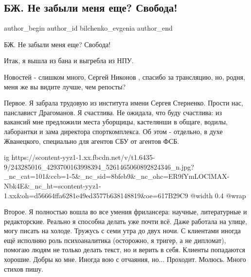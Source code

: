  
 
 
 
 
 
\subsection{БЖ. Не забыли меня еще? Свобода!}
\label{sec:28_09_2021.fb.bilchenko_evgenia.1.ne_zabyli_svoboda}
 
\ifcmt
 author_begin
   author_id bilchenko_evgenia
 author_end
\fi

БЖ. Не забыли меня еще? Свобода!

Итак, я вышла из бана и выгребла из НПУ. 

Новостей - слишком много, Сергей Никонов , спасибо за трансляцию, но, родня,
меня же вы видите лучше, чем репосты? 

Первое. Я забрала трудовую из института имени Сергея Стерненко. Прости нас,
панславист Драгоманов. Я счастлива. Не ожидала, что буду счастлива: из вакансий
мне предложили места уборщицы, кастелянши в общаге, водилы, лаборантки и зама
директора спорткомплекса. Об этом - отдельно, в духе Жванецкого, специально для
агентов СБУ от агентов ФСБ.

\ifcmt
  ig https://scontent-yyz1-1.xx.fbcdn.net/v/t1.6435-9/243285016_4293700163998394_5261465060892824346_n.jpg?_nc_cat=101&ccb=1-5&_nc_sid=8bfeb9&_nc_ohc=ER9fYmLOClMAX-Nbk4E&_nc_ht=scontent-yyz1-1.xx&oh=d56664ffa6281e49ed3577b638148819&oe=617B29C9
  @width 0.4
  @wrap 
\fi

Второе. Я полностью вошла во все умения фрилансера: научные, литературные и
редакторские. Реально я способна делать уже почти всё. Даже работала на улице,
могу писать на холоде. Тружусь с семи утра до двух ночи. С клиентами иногда ещё
исполняю роль психоаналитика (осторожно, я тригер, а не дипломат), помогаю
людям не только делать текст, но и верить в себя. Клиенты попадаются хорошие.
Добры ко мне. Иногда вою с отчаяния, но... Проходит. Молюсь. Много стихов пишу.

